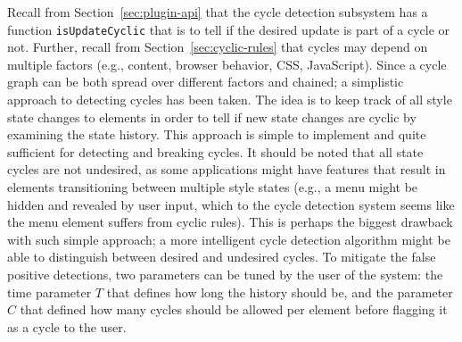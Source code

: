 \documentclass[a4paper,11pt]{kth-mag}
\newcommand{\code}[1]{\texttt{#1}}
\begin{document}
      Recall from Section~\ref{sec:plugin-api} that the cycle detection subsystem has a function \code{isUpdateCyclic} that is to tell if the desired update is part of a cycle or not.
      Further, recall from Section~\ref{sec:cyclic-rules} that cycles may depend on multiple factors (e.g., content, browser behavior, \gls{CSS}, \gls{JavaScript}).
      Since a cycle graph can be both spread over different factors and chained; a simplistic approach to detecting cycles has been taken.
      The idea is to keep track of all style state changes to elements in order to tell if new state changes are cyclic by examining the state history.
      This approach is simple to implement and quite sufficient for detecting and breaking cycles.
      It should be noted that all state cycles are not undesired, as some applications might have features that result in elements transitioning between multiple style states (e.g., a menu might be hidden and revealed by user input, which to the cycle detection system seems like the menu element suffers from cyclic rules).
      This is perhaps the biggest drawback with such simple approach; a more intelligent cycle detection algorithm might be able to distinguish between desired and undesired cycles.
      To mitigate the false positive detections, two parameters can be tuned by the user of the system: the time parameter $T$ that defines how long the history should be, and the parameter $C$ that defined how many cycles should be allowed per element before flagging it as a cycle to the user.
      
\end{document}
